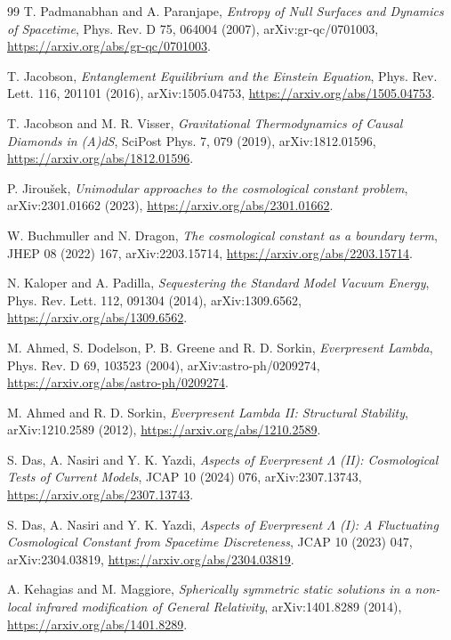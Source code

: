 \documentclass[11pt,a4paper]{article}
\begin{document}
\begin{thebibliography}{99}
T. Padmanabhan and A. Paranjape,
\textit{Entropy of Null Surfaces and Dynamics of Spacetime},
Phys. Rev. D 75, 064004 (2007),
arXiv:gr-qc/0701003,
\url{https://arxiv.org/abs/gr-qc/0701003}.

T. Jacobson,
\textit{Entanglement Equilibrium and the Einstein Equation},
Phys. Rev. Lett. 116, 201101 (2016),
arXiv:1505.04753,
\url{https://arxiv.org/abs/1505.04753}.

T. Jacobson and M. R. Visser,
\textit{Gravitational Thermodynamics of Causal Diamonds in (A)dS},
SciPost Phys. 7, 079 (2019),
arXiv:1812.01596,
\url{https://arxiv.org/abs/1812.01596}.

P. Jirou\v{s}ek,
\textit{Unimodular approaches to the cosmological constant problem},
arXiv:2301.01662 (2023),
\url{https://arxiv.org/abs/2301.01662}.

W. Buchmuller and N. Dragon,
\textit{The cosmological constant as a boundary term},
JHEP 08 (2022) 167,
arXiv:2203.15714,
\url{https://arxiv.org/abs/2203.15714}.

N. Kaloper and A. Padilla,
\textit{Sequestering the Standard Model Vacuum Energy},
Phys. Rev. Lett. 112, 091304 (2014),
arXiv:1309.6562,
\url{https://arxiv.org/abs/1309.6562}.

M. Ahmed, S. Dodelson, P. B. Greene and R. D. Sorkin,
\textit{Everpresent Lambda},
Phys. Rev. D 69, 103523 (2004),
arXiv:astro-ph/0209274,
\url{https://arxiv.org/abs/astro-ph/0209274}.

M. Ahmed and R. D. Sorkin,
\textit{Everpresent Lambda II: Structural Stability},
arXiv:1210.2589 (2012),
\url{https://arxiv.org/abs/1210.2589}.

S. Das, A. Nasiri and Y. K. Yazdi,
\textit{Aspects of Everpresent $\Lambda$ (II): Cosmological Tests of Current Models},
JCAP 10 (2024) 076,
arXiv:2307.13743,
\url{https://arxiv.org/abs/2307.13743}.

S. Das, A. Nasiri and Y. K. Yazdi,
\textit{Aspects of Everpresent $\Lambda$ (I): A Fluctuating Cosmological Constant from Spacetime Discreteness},
JCAP 10 (2023) 047,
arXiv:2304.03819,
\url{https://arxiv.org/abs/2304.03819}.

A. Kehagias and M. Maggiore,
\textit{Spherically symmetric static solutions in a non-local infrared modification of General Relativity},
arXiv:1401.8289 (2014),
\url{https://arxiv.org/abs/1401.8289}.


\end{thebibliography}
\end{document}
